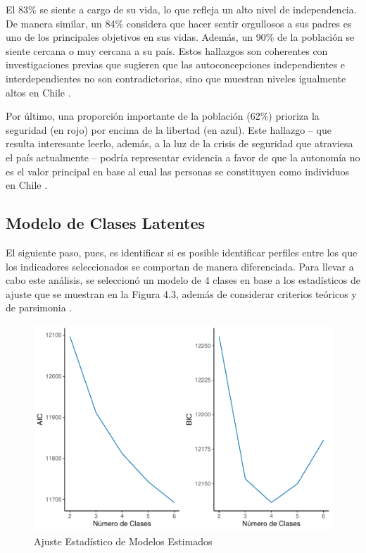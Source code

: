 \documentclass[12pt,twoside]{templates/facsothesis}
\begin{document}
El 83\% se siente a cargo de su vida, lo que refleja un alto nivel de independencia. De manera similar, un 84\% considera que hacer sentir orgullosos a sus padres es uno de los principales objetivos en sus vidas. Además, un 90\% de la población se siente cercana o muy cercana a su país. Estos hallazgos son coherentes con investigaciones previas que sugieren que las autoconcepciones independientes e interdependientes no son contradictorias, sino que muestran niveles igualmente altos en Chile \citep{benavides2020, kolstad2009}.

Por último, una proporción importante de la población (62\%) prioriza la seguridad (en rojo) por encima de la libertad (en azul). Este hallazgo -- que resulta interesante leerlo, además, a la luz de la crisis de seguridad que atraviesa el país actualmente -- podría representar evidencia a favor de que la autonomía no es el valor principal en base al cual las personas se constituyen como individuos en Chile \citep{martuccelli2010}.

\hypertarget{modelo-de-clases-latentes}{%
\subsection*{Modelo de Clases Latentes}\label{modelo-de-clases-latentes}}

El siguiente paso, pues, es identificar si es posible identificar perfiles entre los que los indicadores seleccionados se comportan de manera diferenciada. Para llevar a cabo este análisis, se seleccionó un modelo de 4 clases en base a los estadísticos de ajuste que se muestran en la Figura 4.3, además de considerar criterios teóricos y de parsimonia \citep{collins2010}.

\begin{figure}[!ht]

{\centering \includegraphics[width=1\linewidth,]{tesis_files/figure-latex/unnamed-chunk-9-1} 

}

\caption{Ajuste Estadístico de Modelos Estimados}\label{fig:unnamed-chunk-9}
\end{figure}
\FloatBarrier
\end{document}
